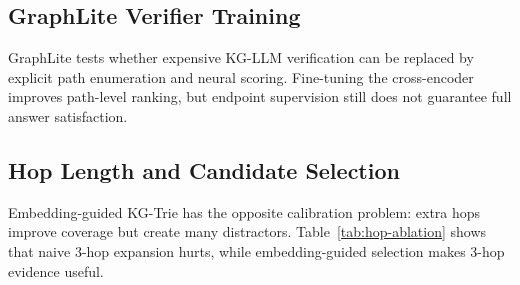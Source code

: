 \documentclass[10pt,twocolumn]{article}
\begin{document}
\subsection{GraphLite Verifier Training}
GraphLite tests whether expensive KG-LLM verification can be replaced by explicit path enumeration and neural scoring. Fine-tuning the cross-encoder improves path-level ranking, but endpoint supervision still does not guarantee full answer satisfaction.

\begin{table}[H]
\centering
\scriptsize
{}
\caption{GraphLite path-reranker training metrics on held-out grouped path candidates. Values are percentages except group count.}
\label{tab:graphlite-training}
\end{table}

\subsection{Hop Length and Candidate Selection}
Embedding-guided KG-Trie has the opposite calibration problem: extra hops improve coverage but create many distractors. Table~\ref{tab:hop-ablation} shows that naive 3-hop expansion hurts, while embedding-guided selection makes 3-hop evidence useful.

\begin{table}[H]
\centering
\scriptsize
{}
\caption{Hop-length and output-selection ablation on CWQ20. Extra hops help only when semantic selection and candidate filtering control path explosion.}
\label{tab:hop-ablation}
\end{table}
\end{document}
